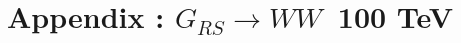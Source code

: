 \documentclass{cernrep}
\newcommand*{\rsg}{\ensuremath{G_{RS} \rightarrow WW}}
\begin{document}
\clearpage
\newpage

\section{Appendix : \rsg\ 100 TeV}
\label{appendix:rsg100}

\end{document}
